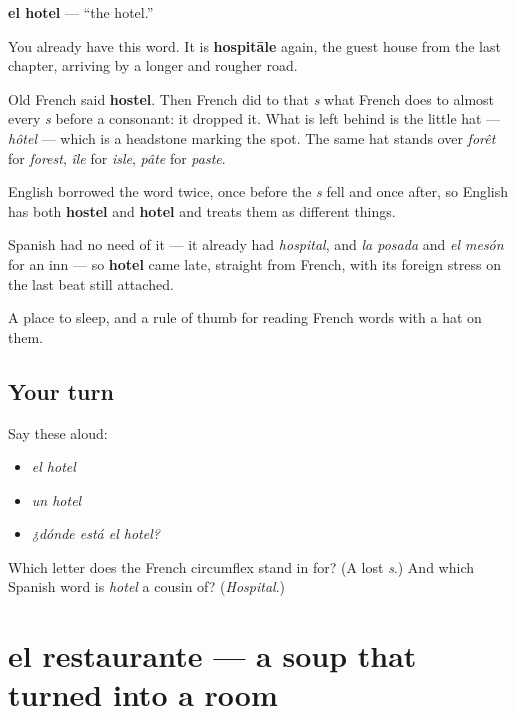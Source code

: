 \begin{cousinweb}
\textbf{el hotel} — \textquotedblleft{}the hotel.\textquotedblright{}

You already have this word. It is \textbf{hospitāle} again, the guest house from the last chapter, arriving by a longer and rougher road.

Old French said \textbf{hostel}. Then French did to that \emph{s} what French does to almost every \emph{s} before a consonant: it dropped it. What is left behind is the little hat — \emph{hôtel} — which is a headstone marking the spot. The same hat stands over \emph{forêt} for \emph{forest}, \emph{île} for \emph{isle}, \emph{pâte} for \emph{paste}.

English borrowed the word twice, once before the \emph{s} fell and once after, so English has both \textbf{hostel} and \textbf{hotel} and treats them as different things.

Spanish had no need of it — it already had \emph{hospital}, and \emph{la posada} and \emph{el mesón} for an inn — so \textbf{hotel} came late, straight from French, with its foreign stress on the last beat still attached.
\end{cousinweb}

\begin{grammarlens}[title={What you've built}]
A place to sleep, and a rule of thumb for reading French words with a hat on them.
\end{grammarlens}

\subsection*{Your turn}
Say these aloud:

\begin{itemize}
\raggedright
  \item \emph{el hotel}
  \item \emph{un hotel}
  \item \emph{¿dónde está el hotel?}
\end{itemize}

\begin{tcolorbox}[breakable,colback=teal!4,colframe=teal!35!black,title={Before you move on}]
Which letter does the French circumflex stand in for? (A lost \emph{s}.) And which Spanish word is \emph{hotel} a cousin of? (\emph{Hospital}.)
\end{tcolorbox}
\section[el restaurante]{el restaurante — a soup that turned into a room}

